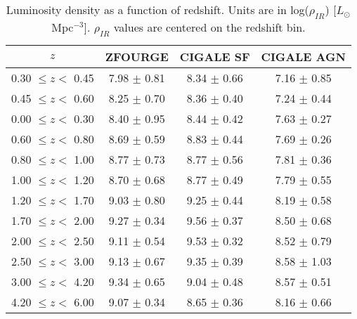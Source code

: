 \begin{table}[h]
    \begin{center}
    \caption{Luminosity density as a function of redshift. Units are in log($\rho_{IR}$) [$L_{\odot}$ Mpc$^{-3}$]. $\rho_{IR}$ values are centered on the redshift bin.}
    \label{Tab: SFRD}
    \begin{tabular}{@{}cccc@{}}
        \toprule
        $z$ & ZFOURGE & CIGALE SF & CIGALE AGN \\
        \hline
        0.30 $\leq z <$ 0.45 & 7.98 $\pm$ 0.81 & 8.34 $\pm$ 0.66 & 7.16 $\pm$ 0.85 \\
        0.45 $\leq z <$ 0.60 & 8.25 $\pm$ 0.70 & 8.36 $\pm$ 0.40 & 7.24 $\pm$ 0.44 \\
        0.00 $\leq z <$ 0.30 & 8.40 $\pm$ 0.95 & 8.44 $\pm$ 0.42 & 7.63 $\pm$ 0.27 \\
        0.60 $\leq z <$ 0.80 & 8.69 $\pm$ 0.59 & 8.83 $\pm$ 0.44 & 7.69 $\pm$ 0.26 \\
        0.80 $\leq z <$ 1.00 & 8.77 $\pm$ 0.73 & 8.77 $\pm$ 0.56 & 7.81 $\pm$ 0.36 \\
        1.00 $\leq z <$ 1.20 & 8.70 $\pm$ 0.68 & 8.77 $\pm$ 0.49 & 7.79 $\pm$ 0.55 \\
        1.20 $\leq z <$ 1.70 & 9.03 $\pm$ 0.80 & 9.25 $\pm$ 0.44 & 8.19 $\pm$ 0.58 \\
        1.70 $\leq z <$ 2.00 & 9.27 $\pm$ 0.34 & 9.56 $\pm$ 0.37 & 8.50 $\pm$ 0.68 \\
        2.00 $\leq z <$ 2.50 & 9.11 $\pm$ 0.54 & 9.53 $\pm$ 0.32 & 8.52 $\pm$ 0.79 \\
        2.50 $\leq z <$ 3.00 & 9.13 $\pm$ 0.67 & 9.35 $\pm$ 0.39 & 8.58 $\pm$ 1.03 \\
        3.00 $\leq z <$ 4.20 & 9.34 $\pm$ 0.65 & 9.04 $\pm$ 0.48 & 8.57 $\pm$ 0.51 \\
        4.20 $\leq z <$ 6.00 & 9.07 $\pm$ 0.34 & 8.65 $\pm$ 0.36 & 8.16 $\pm$ 0.66 
        \botrule
    \end{tabular}
    \end{center}        
\end{table}

